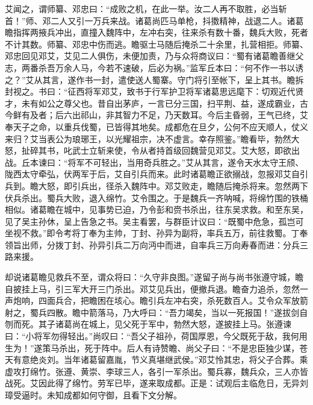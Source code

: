 艾闻之，谓师纂、邓忠曰：“成败之机，在此一举。汝二人再不取胜，必当斩首！”师、邓二人又引一万兵来战。诸葛尚匹马单枪，抖擞精神，战退二人。诸葛瞻指挥两掖兵冲出，直撞入魏阵中，左冲右突，往来杀有数十番，魏兵大败，死者不计其数。师纂、邓忠中伤而逃。瞻驱士马随后掩杀二十余里，扎营相拒。师纂、邓忠回见邓艾，艾见二人俱伤，未便加责，乃与众将商议曰：“蜀有诸葛瞻善继父志，两番杀吾万余人马，今若不速破，后必为祸。”监军丘本曰：“何不作一书以诱之？”艾从其言，遂作书一封，遣使送人蜀寨。守门将引至帐下，呈上其书。瞻拆封视之。书曰：“征西将军邓艾，致书于行军护卫将军诸葛思远麾下：切观近代贤才，未有如公之尊父也。昔自出茅庐，一言已分三国，扫平荆、益，遂成霸业，古今鲜有及者；后六出祁山，非其智力不足，乃天数耳。今后主昏弱，王气已终，艾奉天子之命，以重兵伐蜀，已皆得其地矣。成都危在旦夕，公何不应天顺人，仗义来归？艾当表公为琅琊王，以光耀祖宗，决不虚言。幸存照鉴。”瞻看毕，勃然大怒，扯碎其书，叱武士立斩来使，令从者持首级回魏营见邓艾。艾大怒，即欲出战。丘本谏曰：“将军不可轻出，当用奇兵胜之。”艾从其言，遂令天水太守王颀、陇西太守牵弘，伏两军于后，艾自引兵而来。此时诸葛瞻正欲搦战，忽报邓艾自引兵到。瞻大怒，即引兵出，径杀入魏阵中。邓艾败走，瞻随后掩杀将来。忽然两下伏兵杀出。蜀兵大败，退入绵竹。艾令围之。于是魏兵一齐呐喊，将绵竹围的铁桶相似。诸葛瞻在城中，见事势已迫，乃令彭和赍书杀出，往东吴求救。和至东吴，见了吴主孙休，呈上告急之书。吴主看罢，与群臣计议曰：“既蜀中危急，孤岂可坐视不救。”即令考将丁奉为主帅，丁封、孙异为副将，率兵五万，前往救蜀。丁奉领旨出师，分拨丁封、孙异引兵二万向沔中而进，自率兵三万向寿春而进：分兵三路来援。

却说诸葛瞻见救兵不至，谓众将曰：“久守非良图。”遂留子尚与尚书张遵守城，瞻自披挂上马，引三军大开三门杀出。邓艾见兵出，便撤兵退。瞻奋力追杀，忽然一声炮响，四面兵合，把瞻困在垓心。瞻引兵左冲右突，杀死数百人。艾令众军放箭射之，蜀兵四散。瞻中箭落马，乃大呼曰：“吾力竭矣，当以一死报国！”遂拔剑自刎而死。其子诸葛尚在城上，见父死于军中，勃然大怒，遂披挂上马。张遵谏曰：“小将军勿得轻出。”尚叹曰：“吾父子祖孙，荷国厚恩，今父既死于敌，我何用生为！”遂策马杀出，死于阵中。后人有诗赞瞻、尚父子曰：“不是忠臣独少谋，苍天有意绝炎刘。当年诸葛留嘉胤，节义真堪继武侯。”邓艾怜其忠，将父子合葬。乘虚攻打绵竹。张遵、黄崇、李球三人，各引一军杀出。蜀兵寡，魏兵众，三人亦皆战死。艾因此得了绵竹。劳军已毕，遂来取成都。正是：试观后主临危日，无异刘璋受逼时。未知成都如何守御，且看下文分解。